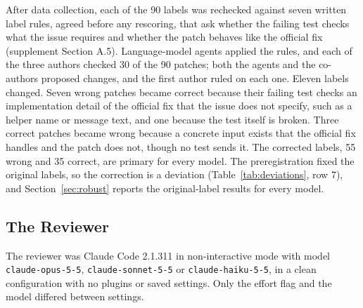 \documentclass[sigconf,nonacm]{acmart}
\newcommand{\code}[1]{\texttt{#1}}
\begin{document}
After data collection, each of the 90 labels was rechecked against seven written label rules, agreed before any rescoring, that ask whether the failing test checks what the issue requires and whether the patch behaves like the official fix (supplement Section A.5). Language-model agents applied the rules, and each of the three authors checked 30 of the 90 patches; both the agents and the co-authors proposed changes, and the first author ruled on each one. Eleven labels changed. Seven wrong patches became correct because their failing test checks an implementation detail of the official fix that the issue does not specify, such as a helper name or message text, and one because the test itself is broken. Three correct patches became wrong because a concrete input exists that the official fix handles and the patch does not, though no test sends it. The corrected labels, 55 wrong and 35 correct, are primary for every model. The preregistration fixed the original labels, so the correction is a deviation (Table~\ref{tab:deviations}, row 7), and Section~\ref{sec:robust} reports the original-label results for every model.

\subsection{The Reviewer}\label{sec:reviewer}

The reviewer was Claude Code 2.1.311 in non-interactive mode with model \code{claude-\allowbreak opus-5-5}, \code{claude-\allowbreak sonnet-5-5} or \code{claude-\allowbreak haiku-5-5}, in a clean configuration with no plugins or saved settings. Only the effort flag and the model differed between settings.
\end{document}

